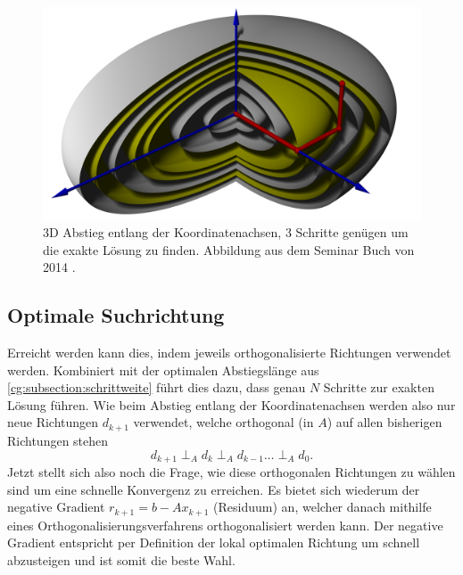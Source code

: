 \begin{figure}	
	\centering
	\includegraphics[width=0.8\hsize]{papers/cg/images/descent3d.jpg}
	\caption{3D Abstieg entlang der Koordinatenachsen, 3 Schritte genügen um die exakte Lösung zu finden. 
		Abbildung aus dem Seminar Buch von 2014 \cite{cg:book:hpc}.}
	\label{cg:abb:koordabstieg2}
\end{figure}



\subsection{Optimale Suchrichtung \label{cg:subsection:suchrichtung}}

Erreicht werden kann dies, indem jeweils orthogonalisierte Richtungen verwendet werden.
Kombiniert mit der optimalen Abstiegslänge aus \ref{cg:subsection:schrittweite} führt dies dazu, dass genau $N$ Schritte zur exakten Lösung führen.
Wie beim Abstieg entlang der Koordinatenachsen werden also nur neue Richtungen $d_{k+1}$ verwendet, welche orthogonal (in $A$) auf allen bisherigen Richtungen stehen
\begin{equation} 
	d_{k+1}  \perp_A  d_k  \perp_A  d_{k-1}  \dots \perp_A  d_0.
\end{equation}
Jetzt stellt sich also noch die Frage, wie diese orthogonalen Richtungen zu wählen sind um eine schnelle Konvergenz zu erreichen.
Es bietet sich wiederum der negative Gradient $r_{k+1} = b - Ax_{k+1}$ (Residuum) an, welcher danach mithilfe eines Orthogonalisierungsverfahrens orthogonalisiert werden kann.
Der negative Gradient entspricht per Definition der lokal optimalen Richtung um schnell abzusteigen und ist somit die beste Wahl.

